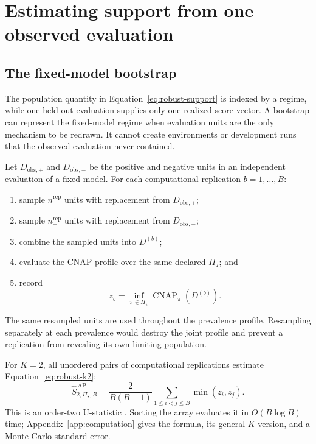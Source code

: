 \documentclass[11pt]{article}
\newcommand{\CNAP}{\operatorname{CNAP}}
\newcommand{\PSet}{\Pi_\star}
\theoremstyle{remark}
\begin{document}
\section{Estimating support from one observed evaluation}
\label{sec:estimation}

\subsection{The fixed-model bootstrap}

The population quantity in Equation~\eqref{eq:robust-support} is indexed by a regime, while one held-out evaluation supplies only one realized score vector. A bootstrap can represent the fixed-model regime when evaluation units are the only mechanism to be redrawn. It cannot create environments or development runs that the observed evaluation never contained.

Let $D_{\mathrm{obs},+}$ and $D_{\mathrm{obs},-}$ be the positive and negative units in an independent evaluation of a fixed model. For each computational replication $b=1,\ldots,B$:
\begin{enumerate}
\item sample $n_+^{\mathrm{rep}}$ units with replacement from $D_{\mathrm{obs},+}$;
\item sample $n_-^{\mathrm{rep}}$ units with replacement from $D_{\mathrm{obs},-}$;
\item combine the sampled units into $D^{(b)}$;
\item evaluate the CNAP profile over the same declared $\PSet$; and
\item record
\[
z_b
=
\inf_{\pi\in\PSet}\CNAP_\pi(D^{(b)}).
\]
\end{enumerate}
The same resampled units are used throughout the prevalence profile. Resampling separately at each prevalence would destroy the joint profile and prevent a replication from revealing its own limiting population.

For $K=2$, all unordered pairs of computational replications estimate Equation~\eqref{eq:robust-k2}:
\begin{equation}
\widehat S_{2,\PSet,B}^{\,\mathrm{AP}}
=
\frac{2}{B(B-1)}
\sum_{1\leq i<j\leq B}\min(z_i,z_j).
\label{eq:all-pairs}
\end{equation}
This is an order-two U-statistic \cite{hoeffding1948ustat}. Sorting the array evaluates it in $O(B\log B)$ time; Appendix~\ref{app:computation} gives the formula, its general-$K$ version, and a Monte Carlo standard error.
\end{document}

